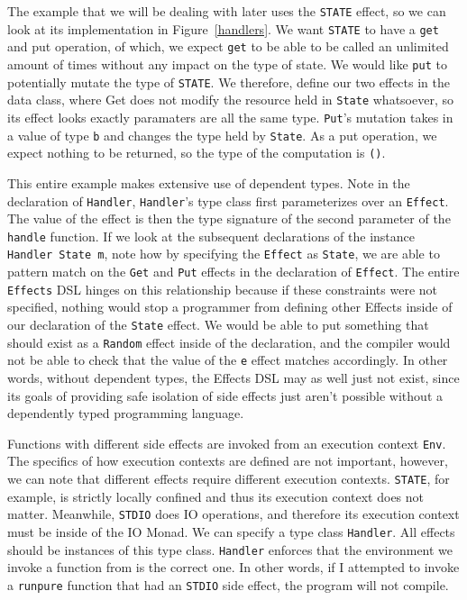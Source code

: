 The example that we will be dealing with later uses the \texttt{STATE} effect,
so we can look at its implementation in Figure~\ref{handlers}. We want
\texttt{STATE} to have a \texttt{get} and {put} operation, of which, we expect
\texttt{get} to be able to be called an unlimited amount of times without any
impact on the type of state. We would like \texttt{put} to potentially mutate
the type of \texttt{STATE}. We therefore, define our two effects in the data
class, where Get does not modify the resource held in \texttt{State} whatsoever,
so its effect looks exactly paramaters are all the same type. \texttt{Put}'s
mutation takes in a value of type \texttt{b} and changes the type held by
\texttt{State}. As a put operation, we expect nothing to be returned, so the
type of the computation is \texttt{()}.

This entire example makes extensive use of dependent types. Note in the
declaration of \texttt{Handler}, \texttt{Handler}'s type class first
parameterizes over an \texttt{Effect}. The value of the effect is then the type
signature of the second parameter of the \texttt{handle} function. If we look at
the subsequent declarations of the instance \texttt{Handler State m}, note how
by specifying the \texttt{Effect} as \texttt{State}, we are able to pattern
match on the \texttt{Get} and \texttt{Put} effects in the declaration of
\texttt{Effect}. The entire \texttt{Effects} DSL hinges on this relationship
because if these constraints were not specified, nothing would stop a programmer
from defining other Effects inside of our declaration of the \texttt{State}
effect. We would be able to put something that should exist as a \texttt{Random}
effect inside of the declaration, and the compiler would not be able to check
that the value of the \texttt{e} effect matches accordingly. In other words,
without dependent types, the Effects DSL may as well just not exist, since its
goals of providing safe isolation of side effects just aren't possible without a
dependently typed programming language.

Functions with different side effects are invoked from an execution context
\texttt{Env}. The specifics of how execution contexts are defined are not
important, however, we can note that different effects require different
execution contexts. \texttt{STATE}, for example, is strictly locally confined
and thus its execution context does not matter. Meanwhile, \texttt{STDIO} does
IO operations, and therefore its execution context must be inside of the IO
Monad. We can specify a type class \texttt{Handler}. All effects should be
instances of this type class. \texttt{Handler} enforces that the environment we
invoke a function from is the correct one. In other words, if I attempted to
invoke a \texttt{runpure} function that had an \texttt{STDIO} side effect, the
program will not compile. 

